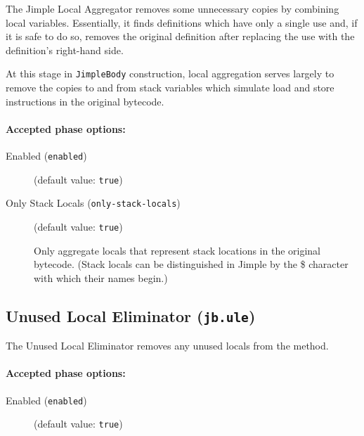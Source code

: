 \documentclass{article}
\begin{document}
\par

The Jimple Local Aggregator removes some unnecessary copies by
combining local variables. Essentially, it finds definitions
which have only a single use and, if it is safe to do so, removes
the original definition after replacing the use with the
definition's right-hand side.

\par

At this stage in {\tt JimpleBody} construction, local
aggregation serves largely to remove the copies to and from stack
variables which simulate load and store instructions in the
original bytecode.


\paragraph{Accepted phase options:} 

\begin{description}

\item[Enabled ({\tt enabled})]
(default value: {\tt true})






\item[Only Stack Locals ({\tt only-stack-locals})]
(default value: {\tt true})




Only aggregate locals that represent stack locations in the
original bytecode.  (Stack locals can be distinguished in Jimple
by the \$ character with which their names begin.)



\end{description}

\subsection{Unused Local Eliminator ({\tt jb.ule})}

The Unused Local Eliminator removes any unused locals from the
method.


\paragraph{Accepted phase options:} 

\begin{description}

\item[Enabled ({\tt enabled})]
(default value: {\tt true})






\end{description}
\end{document}
